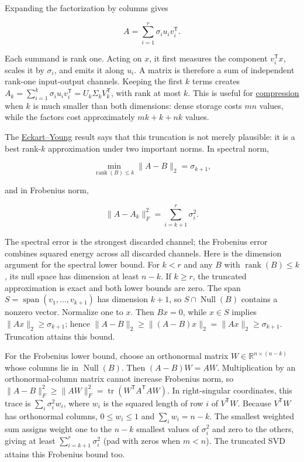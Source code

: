 \hypertarget{02-foundations-ii-ch024-low-rank-approximation-and-why-the-largest-directions-win}{}

Expanding the factorization by columns gives

\[
A=\sum_{i=1}^{r}\sigma_i u_i v_i^\mathsf T.
\]

Each summand is rank one. Acting on \(x\), it first measures the component \(v_i^\mathsf T x\), scales it by \(\sigma_i\), and emits it along \(u_i\). A matrix is therefore a sum of independent rank-one input-output channels. Keeping the first \(k\) terms creates \(A_k=\sum_{i=1}^k\sigma_i u_i v_i^\mathsf T=U_k\Sigma_kV_k^\mathsf T\), with rank at most \(k\). This is useful for \hyperref[02-foundations-ii-ch024-full-thin-and-compact-shapes-for-tall-and-wide-matrices]{compression} when \(k\) is much smaller than both dimensions: dense storage costs \(mn\) values, while the factors cost approximately \(mk+k+nk\) values.

The \hyperref[02-foundations-ii-ch024-full-thin-and-compact-shapes-for-tall-and-wide-matrices]{Eckart--Young} result says that this truncation is not merely plausible: it is a best rank-\(k\) approximation under two important norms. In spectral norm,

\[
\min_{\operatorname{rank}(B)\le k}\|A-B\|_2=\sigma_{k+1},
\]

and in Frobenius norm,

\[
\|A-A_k\|_F^2=\sum_{i=k+1}^{r}\sigma_i^2.
\]

The spectral error is the strongest discarded channel; the Frobenius error combines squared energy across all discarded channels. Here is the dimension argument for the spectral lower bound. For \(k<r\) and any \(B\) with \(\operatorname{rank}(B)\le k\), its null space has dimension at least \(n-k\). If \(k\ge r\), the truncated approximation is exact and both lower bounds are zero. The span \(S=\operatorname{span}(v_1,\ldots,v_{k+1})\) has dimension \(k+1\), so \(S\cap\operatorname{Null}(B)\) contains a nonzero vector. Normalize one to \(x\). Then \(Bx=0\), while \(x\in S\) implies \(\|Ax\|_2\ge\sigma_{k+1}\); hence \(\|A-B\|_2\ge\|(A-B)x\|_2=\|Ax\|_2\ge\sigma_{k+1}\). Truncation attains this bound.

For the Frobenius lower bound, choose an orthonormal matrix \(W\in\mathbb R^{n\times(n-k)}\) whose columns lie in \(\operatorname{Null}(B)\). Then \((A-B)W=AW\). Multiplication by an orthonormal-column matrix cannot increase Frobenius norm, so \(\|A-B\|_F^2\ge\|AW\|_F^2=\operatorname{tr}(W^\mathsf TA^\mathsf TAW)\). In right-singular coordinates, this trace is \(\sum_i\sigma_i^2 w_i\), where \(w_i\) is the squared length of row \(i\) of \(V^\mathsf TW\). Because \(V^\mathsf TW\) has orthonormal columns, \(0\le w_i\le1\) and \(\sum_iw_i=n-k\). The smallest weighted sum assigns weight one to the \(n-k\) smallest values of \(\sigma_i^2\) and zero to the others, giving at least \(\sum_{i=k+1}^{r}\sigma_i^2\) (pad with zeros when \(m<n\)). The truncated SVD attains this Frobenius bound too.

